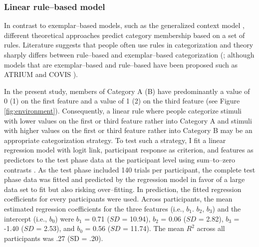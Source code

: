 \documentclass[a4paper,man,natbib]{apa6}
\begin{document}
\subsubsection{Linear rule--based model}
In contrast to exemplar--based models, such as the generalized context model \citep{nosofsky1986attention}, different theoretical approaches predict category membership based on a set of rules. Literature suggests that people often use rules in categorization \citep{restle1962selection, tom1968attention, rouder2006comparing} and theory sharply differs between rule--based and exemplar--based categorization (\citealp{rouder2006comparing}; although models that are exemplar--based and rule--based have been proposed such as ATRIUM \citealp{erickson1998rules} and COVIS \citealp{ashby2011covis}). 

In the present study, members of Category A (B) have predominantly a value of 0 (1) on the first feature and a value of 1 (2) on the third feature (see Figure \ref{fig:environment}). Consequently, a linear rule where people categorize stimuli with lower values on the first or third feature rather into Category A and stimuli with higher values on the first or third feature rather into Category B may be an appropriate categorization strategy. To test such a strategy, I fit a linear regression model with logit link, participant response as criterion, and features as predictors to the test phase data at the participant level using sum--to--zero contrasts \citep{singmann2017introduction}. As the test phase included 140 trials per participant, the complete test phase data was fitted and predicted by the regression model in favor of a large data set to fit but also risking over--fitting. In prediction, the fitted regression coefficients for every participants were used. Across participants, the mean estimated regression coefficients for the three features (i.e., $b_1$. $b_2$, $b_3$) and the intercept (i.e., $b_0$) were $b_1$ = 0.71 ($SD$ = 10.94), $b_2$ = 0.06 ($SD$ = 2.82), $b_3$ = -1.40 ($SD$ = 2.53), and $b_0$ = 0.56 ($SD$ = 11.74). The mean $R^2$ across all participants was .27 (SD = .20). 
\end{document}
